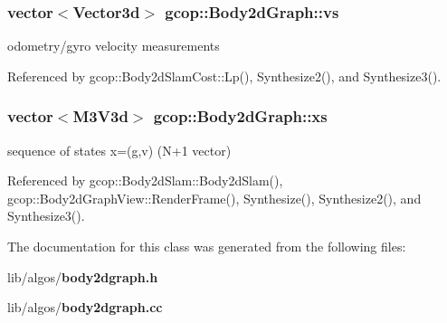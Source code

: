 \subsubsection[{vs}]{\setlength{\rightskip}{0pt plus 5cm}vector$<$\-Vector3d$>$ {\bf gcop\-::\-Body2d\-Graph\-::vs}}\label{classgcop_1_1Body2dGraph_ae0721884fc06c747df88dc74919b9551}


odometry/gyro velocity measurements 



\-Referenced by gcop\-::\-Body2d\-Slam\-Cost\-::\-Lp(), \-Synthesize2(), and \-Synthesize3().

\subsubsection[{xs}]{\setlength{\rightskip}{0pt plus 5cm}vector$<${\bf \-M3\-V3d}$>$ {\bf gcop\-::\-Body2d\-Graph\-::xs}}\label{classgcop_1_1Body2dGraph_ac4ce304f4b70282f5a66e408c3aa83a8}


sequence of states x=(g,v) (\-N+1 vector) 



\-Referenced by gcop\-::\-Body2d\-Slam\-::\-Body2d\-Slam(), gcop\-::\-Body2d\-Graph\-View\-::\-Render\-Frame(), \-Synthesize(), \-Synthesize2(), and \-Synthesize3().



\-The documentation for this class was generated from the following files\-:\begin{DoxyCompactItemize}
\item 
lib/algos/{\bf body2dgraph.\-h}\item 
lib/algos/{\bf body2dgraph.\-cc}\end{DoxyCompactItemize}

